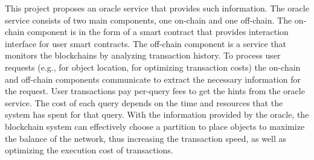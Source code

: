 This project proposes an oracle service that provides such information. The
oracle service consists of two main components, one on-chain and one off-chain.
The on-chain component is in the form of a smart contract that  provides
interaction interface for user smart contracts. The off-chain component is a
service that monitors the blockchains by analyzing transaction history. To
process user requests (e.g., for object location, for optimizing transaction
costs) the on-chain and off-chain components communicate to extract the
necessary information for the request. User transactions pay per-query fees to
get the hints from the oracle service. The cost of each query depends on the
time and resources that the system has spent for that query. With the
information provided by the oracle, the blockchain system can effectively choose
a partition to place objects to maximize the balance of the network, thus
increasing the transaction speed, as well as optimizing the execution cost of
transactions.



